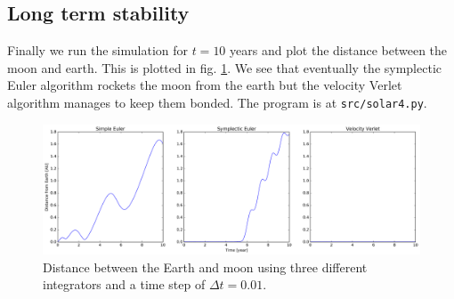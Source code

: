 \documentclass[a4paper,11pt,bibtotoc]{scrartcl}
\begin{document}
\subsection{Long term stability}

Finally we run the simulation for $t = 10$ years and plot the distance between the moon and earth. This is plotted in fig. \ref{fig:solar4}. We see that eventually the symplectic Euler algorithm rockets the moon from the earth but the velocity Verlet algorithm manages to keep them bonded. The program is at \texttt{src/solar4.py}.
\begin{figure}
	\includegraphics[width=1.0\linewidth]{../fig/solar4.png}
	\centering
	\caption{Distance between the Earth and moon using three different integrators and a time step of $\Delta t = 0.01$.}
	\label{fig:solar4}
\end{figure}
\end{document}
